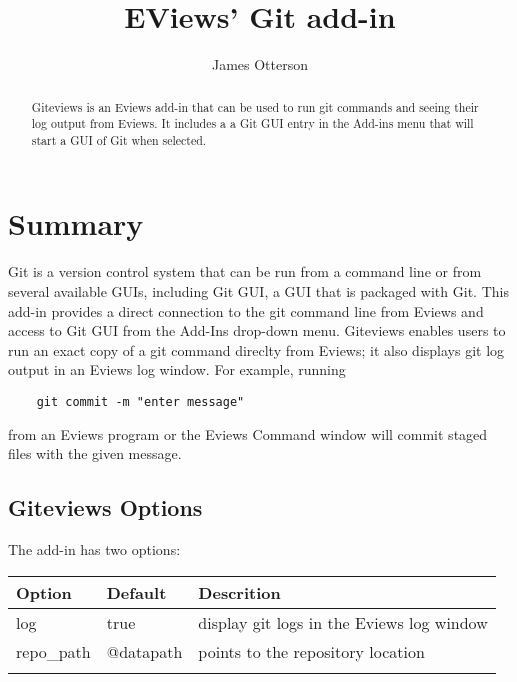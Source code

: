 \documentclass{article}
\title{EViews' Git add-in}
\author{James Otterson}
\begin{document}
\maketitle

\renewcommand{\abstractname}{Overview}
\begin{abstract}
    Giteviews is an Eviews add-in that can be used to run git commands and seeing their log output from Eviews.  It includes a 
    a Git GUI entry in the Add-ins menu that will start a GUI of Git when selected.
\end{abstract}

\section{Summary}

Git is a version control system that can be run from a command line or from several available GUIs, including Git GUI, a GUI that is packaged with Git.  This add-in 
provides a direct connection to the git command line from Eviews and access to Git GUI from the Add-Ins drop-down menu.  Giteviews enables users to run 
an exact copy of a git command direclty from Eviews; it also displays git log output in an Eviews log window.  For example, running
 
\begin{verbatim}
    git commit -m "enter message"
\end{verbatim}

\noindent from an Eviews program or the Eviews Command window will commit staged files with the given message.  

\subsection{Giteviews Options}
  
  The add-in has two options: 
  \begin{table}[h!]
  \centering
  \begin{tabular}{lll} \hline \hline
    Option          & Default       & Descrition \\ \hline
    log             & true          & display git logs in the Eviews log window \\
    repo\_path      & @datapath     & points to the repository location \\ \hline \hline \\
  \end{tabular}
  \end{table}
\end{document}
